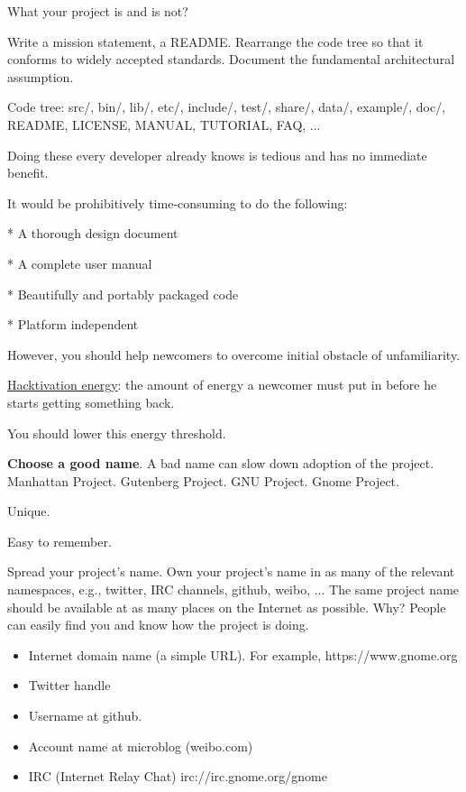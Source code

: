 \documentclass[landscape,30pt]{foils}
\begin{document}
What your project is and is not?

Write a mission statement, a README.  Rearrange the code tree so that it conforms to widely accepted standards.  Document the  fundamental architectural assumption.

Code tree: src/, bin/, lib/, etc/, include/, test/, share/, data/, example/, doc/, README, LICENSE, MANUAL, TUTORIAL, FAQ, ...

Doing these every developer already knows is tedious and has no immediate benefit.


It would be prohibitively time-consuming to do the following:

* A thorough design document

* A complete user manual

* Beautifully and portably packaged code

* Platform independent

However, you should help newcomers to overcome initial obstacle of unfamiliarity.

\underline{Hacktivation energy}: the amount of energy a newcomer must put in before he starts getting something back.

You should lower this energy threshold.


{\bf Choose a good name}.   A bad name can slow down adoption of the project.  Manhattan Project. Gutenberg Project. GNU Project. Gnome Project.

Unique.

Easy to remember.


Spread your project's name.  Own your project's name in as many of the relevant namespaces, e.g., twitter, IRC channels, github, weibo, ...  The same project name should be available at as many places on the Internet as possible.  Why?  People can easily find you and know how the project is doing.

\begin{itemize}
\item Internet domain name (a simple URL). For example,  https://www.gnome.org
\item Twitter handle
\item Username at github.
\item Account name at microblog (weibo.com)
\item IRC (Internet Relay Chat)  irc://irc.gnome.org/gnome
\end{itemize}
\end{document}
